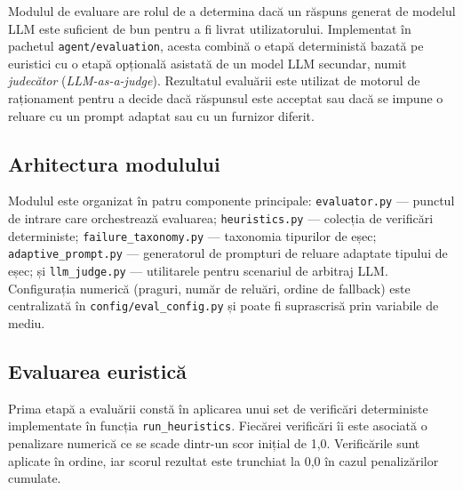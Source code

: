 \documentclass[12pt, a4paper, oneside, romanian]{teza-upb}
\begin{document}
Modulul de evaluare are rolul de a determina dacă un răspuns generat de modelul LLM este suficient de bun pentru a fi livrat utilizatorului. Implementat în pachetul \texttt{agent/evaluation}, acesta combină o etapă deterministă bazată pe euristici cu o etapă opțională asistată de un model LLM secundar, numit \textit{judecător} (\textit{LLM-as-a-judge}). Rezultatul evaluării este utilizat de motorul de raționament pentru a decide dacă răspunsul este acceptat sau dacă se impune o reluare cu un prompt adaptat sau cu un furnizor diferit.

\subsection{Arhitectura modulului}

Modulul este organizat în patru componente principale: \texttt{evaluator.py} — punctul de intrare care orchestrează evaluarea; \texttt{heuristics.py} — colecția de verificări deterministe; \texttt{failure\_taxonomy.py} — taxonomia tipurilor de eșec; \texttt{adaptive\_prompt.py} — generatorul de prompturi de reluare adaptate tipului de eșec; și \texttt{llm\_judge.py} — utilitarele pentru scenariul de arbitraj LLM. Configurația numerică (praguri, număr de reluări, ordine de fallback) este centralizată în \texttt{config/eval\_config.py} și poate fi suprascrisă prin variabile de mediu.

\subsection{Evaluarea euristică}

Prima etapă a evaluării constă în aplicarea unui set de verificări deterministe implementate în funcția \texttt{run\_heuristics}. Fiecărei verificări îi este asociată o penalizare numerică ce se scade dintr-un scor inițial de 1,0. Verificările sunt aplicate în ordine, iar scorul rezultat este trunchiat la 0,0 în cazul penalizărilor cumulate.
\end{document}
